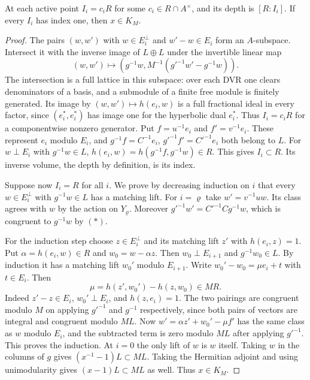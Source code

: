 \begin{proposition}
At each active point $I_i=c_iR$ for some $c_i\in R\cap A^\times$,
and its depth is $[R:I_i]$. If every $I_i$ has index one, then
$x\in K_M$.
\end{proposition}
\begin{proof}
The pairs $(w,w')$ with $w\in E_i^\perp$ and $w'-w\in E_i$
form an $A$-subspace. Intersect it with the inverse image of
$L\oplus L$ under the invertible linear map
\[
 (w,w')\longmapsto (g^{-1}w,M^{-1}(g'^{-1}w'-g^{-1}w)).
\]
The intersection is a full lattice in this subspace: over each DVR
one clears denominators of a basis, and a submodule of a finite free
module is finitely generated. Its image by $(w,w')\mapsto h(e_i,w)$
is a full fractional ideal in every factor, since $(e_i^*,e_i^*)$
has image one for the hyperbolic dual $e_i^*$. Thus $I_i=c_iR$
for a componentwise nonzero generator. Put $f=u^{-1}e_i$ and
$f'=v^{-1}e_i$. These represent $e_i$ modulo $E_i$, and
$g^{-1}f=C^{-1}e_i$, $g'^{-1}f'=C'^{-1}e_i$ both belong to $L$.
For $w\perp E_i$ with $g^{-1}w\in L$,
$h(e_i,w)=h(g^{-1}f,g^{-1}w)\in R$. This gives $I_i\subset R$.
Its inverse volume, the depth by definition, is its index.

Suppose now $I_i=R$ for all $i$. We prove by decreasing induction on
$i$ that every $w\in E_i^\perp$ with $g^{-1}w\in L$ has a matching
lift. For $i=\varrho$ take $w'=v^{-1}u w$. Its class agrees with $w$
by the action on $Y_{\varrho}$. Moreover $g'^{-1}w'=C'^{-1}C g^{-1}w$,
which is congruent to $g^{-1}w$ by $(*)$.

For the induction step choose $z\in E_i^\perp$ and its matching
lift $z'$ with $h(e_i,z)=1$. Put $\alpha=h(e_i,w)\in R$ and
$w_0=w-\alpha z$. Then $w_0\perp E_{i+1}$ and $g^{-1}w_0\in L$.
By induction it has a matching lift $w_0'$ modulo $E_{i+1}$.
Write $w_0'-w_0=\mu e_i+t$ with $t\in E_i$. Then
\[
 \mu=h(z',w_0')-h(z,w_0)\in MR.
\]
Indeed $z'-z\in E_i$, $w_0'\perp E_i$, and $h(z,e_i)=1$.
The two pairings are congruent modulo $M$ on applying $g'^{-1}$ and
$g^{-1}$ respectively, since both pairs of vectors are integral and
congruent modulo $ML$. Now $w'=\alpha z'+w_0'-\mu f'$ has the same
class as $w$ modulo $E_i$, and the subtracted term is zero modulo
$ML$ after applying $g'^{-1}$. This proves the induction.
At $i=0$ the only lift of $w$ is $w$ itself. Taking $w$ in the
columns of $g$ gives $(x^{-1}-1)L\subset ML$. Taking the Hermitian
adjoint and using unimodularity gives $(x-1)L\subset ML$ as well.
Thus $x\in K_M$.
\end{proof}

